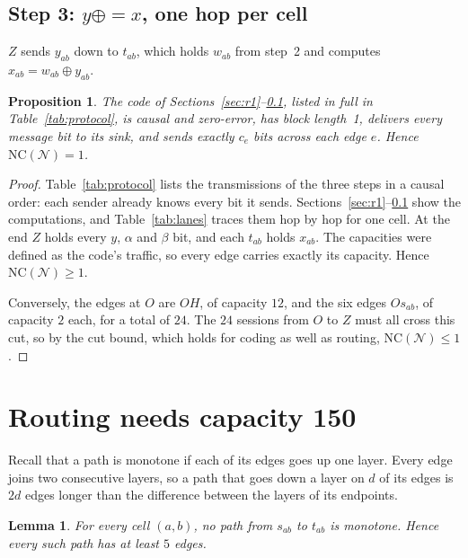 \documentclass[11pt]{article}
\newtheorem{lemma}[theorem]{Lemma}
\newtheorem{proposition}[theorem]{Proposition}
\newcommand{\NC}{\mathrm{NC}}
\newcommand{\xeq}{\mathrel{\oplus\!\!=}}
\begin{document}
\subsection{Step 3: \texorpdfstring{$y\xeq x$}{y ^= x}, one hop per cell}\label{sec:r3}

$Z$ sends $y_{ab}$ down to $t_{ab}$, which holds $w_{ab}$ from step~2 and computes $x_{ab}=w_{ab}\oplus y_{ab}$.

\begin{proposition}\label{prop:code}
The code of Sections~\ref{sec:r1}--\ref{sec:r3}, listed in full in Table~\ref{tab:protocol}, is causal and zero-error, has block length~1, delivers every message bit to its sink, and sends exactly $c_e$ bits across each edge $e$. Hence $\NC(\mathcal N)=1$.
\end{proposition}

\begin{proof}
Table~\ref{tab:protocol} lists the transmissions of the three steps in a causal order: each sender already knows every bit it sends. Sections~\ref{sec:r1}--\ref{sec:r3} show the computations, and Table~\ref{tab:lanes} traces them hop by hop for one cell. At the end $Z$ holds every $y$, $\alpha$ and $\beta$ bit, and each $t_{ab}$ holds $x_{ab}$. The capacities were defined as the code's traffic, so every edge carries exactly its capacity. Hence $\NC(\mathcal N)\ge1$.

Conversely, the edges at $O$ are $OH$, of capacity $12$, and the six edges $Os_{ab}$, of capacity $2$ each, for a total of $24$. The $24$ sessions from $O$ to $Z$ must all cross this cut, so by the cut bound, which holds for coding as well as routing, $\NC(\mathcal N)\le1$.
\end{proof}

\section{Routing needs capacity 150}\label{sec:routing}

Recall that a path is monotone if each of its edges goes up one layer. Every edge joins two consecutive layers, so a path that goes down a layer on $d$ of its edges is $2d$ edges longer than the difference between the layers of its endpoints.

\begin{lemma}\label{lem:monotone}
For every cell $(a,b)$, no path from $s_{ab}$ to $t_{ab}$ is monotone. Hence every such path has at least $5$ edges.
\end{lemma}
\end{document}
